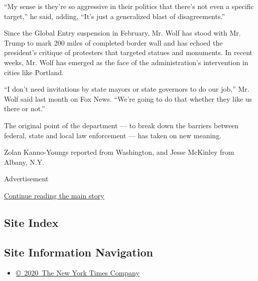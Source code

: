 ``My sense is they're so aggressive in their politics that there's not
even a specific target,'' he said, adding, ``It's just a generalized
blast of disagreements.''

Since the Global Entry suspension in February, Mr. Wolf has stood with
Mr. Trump to mark 200 miles of completed border wall and has echoed the
president's critique of protesters that targeted statues and monuments.
In recent weeks, Mr. Wolf has emerged as the face of the
administration's intervention in cities like Portland.

``I don't need invitations by state mayors or state governors to do our
job,'' Mr. Wolf said last month on Fox News. ``We're going to do that
whether they like us there or not.''

The original point of the department --- to break down the barriers
between federal, state and local law enforcement --- has taken on new
meaning.

Zolan Kanno-Youngs reported from Washington, and Jesse McKinley from
Albany, N.Y.

Advertisement

\protect\hyperlink{after-bottom}{Continue reading the main story}

\hypertarget{site-index}{%
\subsection{Site Index}\label{site-index}}

\hypertarget{site-information-navigation}{%
\subsection{Site Information
Navigation}\label{site-information-navigation}}

\begin{itemize}
\tightlist
\item
  \href{https://help.nytimes3xbfgragh.onion/hc/en-us/articles/115014792127-Copyright-notice}{©~2020~The
  New York Times Company}
\end{itemize}

